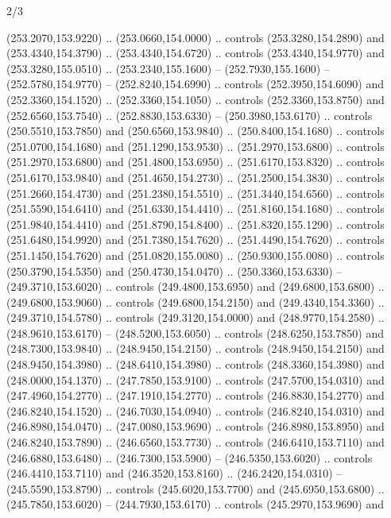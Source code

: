 \begin{flagdescription}{2/3}
\begin{scope}[xshift=0.5\flaglength,yshift=0.5\flagwidth,scale=\flagwidth/259.2]
\begin{scope}[y=0.8pt, x=0.8pt, yscale=-1,shift={(-243,-162)}]
      (253.2070,153.9220) .. (253.0660,154.0000) .. controls (253.3280,154.2890) and
      (253.4340,154.3790) .. (253.4340,154.6720) .. controls (253.4340,154.9770) and
      (253.3280,155.0510) .. (253.2340,155.1600) -- (252.7930,155.1600) --
      (252.5780,154.9770) -- (252.8240,154.6990) .. controls (252.3950,154.6090) and
      (252.3360,154.1520) .. (252.3360,154.1050) .. controls (252.3360,153.8750) and
      (252.6560,153.7540) .. (252.8830,153.6330) -- (250.3980,153.6170) .. controls
      (250.5510,153.7850) and (250.6560,153.9840) .. (250.8400,154.1680) .. controls
      (251.0700,154.1680) and (251.1290,153.9530) .. (251.2970,153.6800) .. controls
      (251.2970,153.6800) and (251.4800,153.6950) .. (251.6170,153.8320) .. controls
      (251.6170,153.9840) and (251.4650,154.2730) .. (251.2500,154.3830) .. controls
      (251.2660,154.4730) and (251.2380,154.5510) .. (251.3440,154.6560) .. controls
      (251.5590,154.6410) and (251.6330,154.4410) .. (251.8160,154.1680) .. controls
      (251.9840,154.4410) and (251.8790,154.8400) .. (251.8320,155.1290) .. controls
      (251.6480,154.9920) and (251.7380,154.7620) .. (251.4490,154.7620) .. controls
      (251.1450,154.7620) and (251.0820,155.0080) .. (250.9300,155.0080) .. controls
      (250.3790,154.5350) and (250.4730,154.0470) .. (250.3360,153.6330) --
      (249.3710,153.6020) .. controls (249.4800,153.6950) and (249.6800,153.6800) ..
      (249.6800,153.9060) .. controls (249.6800,154.2150) and (249.4340,154.3360) ..
      (249.3710,154.5780) .. controls (249.3120,154.0000) and (248.9770,154.2580) ..
      (248.9610,153.6170) -- (248.5200,153.6050) .. controls (248.6250,153.7850) and
      (248.7300,153.9840) .. (248.9450,154.2150) .. controls (248.9450,154.2150) and
      (248.9450,154.3980) .. (248.6410,154.3980) .. controls (248.3360,154.3980) and
      (248.0000,154.1370) .. (247.7850,153.9100) .. controls (247.5700,154.0310) and
      (247.4960,154.2770) .. (247.1910,154.2770) .. controls (246.8830,154.2770) and
      (246.8240,154.1520) .. (246.7030,154.0940) .. controls (246.8240,154.0310) and
      (246.8980,154.0470) .. (247.0080,153.9690) .. controls (246.8980,153.8950) and
      (246.8240,153.7890) .. (246.6560,153.7730) .. controls (246.6410,153.7110) and
      (246.6880,153.6480) .. (246.7300,153.5900) -- (246.5350,153.6020) .. controls
      (246.4410,153.7110) and (246.3520,153.8160) .. (246.2420,154.0310) --
      (245.5590,153.8790) .. controls (245.6020,153.7700) and (245.6950,153.6800) ..
      (245.7850,153.6020) -- (244.7930,153.6170) .. controls (245.2970,153.9690) and

\end{scope}
\end{scope}
\end{flagdescription}
